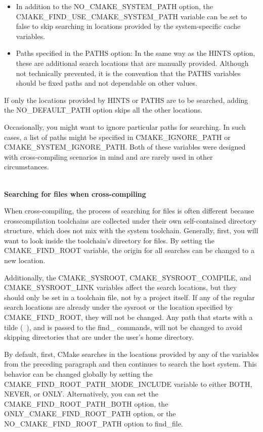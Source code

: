 \begin{itemize}
\item 
In addition to the NO\_CMAKE\_SYSTEM\_PATH option, the CMAKE\_FIND\_USE\_CMAKE\_SYSTEM\_PATH variable can be set to false to skip searching in locations provided by the system-specific cache variables.

\item 
Paths specified in the PATHS option: In the same way as the HINTS option, these are additional search locations that are manually provided. Although not technically prevented, it is the convention that the PATHS variables should be fixed paths and not dependable on other values.
\end{itemize}

If only the locations provided by HINTS or PATHS are to be searched, adding the NO\_DEFAULT\_PATH option skips all the other locations.

Occasionally, you might want to ignore particular paths for searching. In such cases, a list of paths might be specified in CMAKE\_IGNORE\_PATH or CMAKE\_SYSTEM\_IGNORE\_PATH. Both of these variables were designed with cross-compiling scenarios in mind and are rarely used in other circumstances.

\hspace*{\fill} \\ %
\noindent
\textbf{Searching for files when cross-compiling}

When cross-compiling, the process of searching for files is often different because crosscompilation toolchains are collected under their own self-contained directory structure, which does not mix with the system toolchain. Generally, first, you will want to look inside the toolchain's directory for files. By setting the CMAKE\_FIND\_ROOT variable, the origin for all searches can be changed to a new location.

Additionally, the CMAKE\_SYSROOT, CMAKE\_SYSROOT\_COMPILE, and CMAKE\_SYSROOT\_LINK variables affect the search locations, but they should only be set in a toolchain file, not by a project itself. If any of the regular search locations are already under the sysroot or the location specified by CMAKE\_FIND\_ROOT, they will not be changed. Any path that starts with a tilde (~), and is passed to the find\_ commands, will not be changed to avoid skipping directories that are under the user's home directory.

By default, first, CMake searches in the locations provided by any of the variables from the preceding paragraph and then continues to search the host system. This behavior can be changed globally by setting the CMAKE\_FIND\_ROOT\_PATH\_MODE\_INCLUDE variable to either BOTH, NEVER, or ONLY. Alternatively, you can set the CMAKE\_FIND\_ROOT\_PATH\_BOTH option, the ONLY\_CMAKE\_FIND\_ROOT\_PATH option, or the NO\_CMAKE\_FIND\_ROOT\_PATH option to find\_file.

